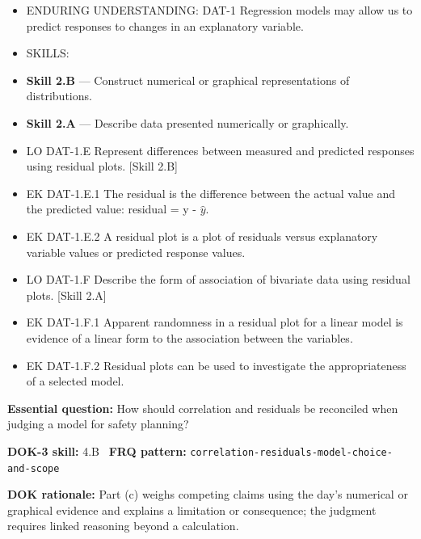 \documentclass[11pt]{article}
\begin{document}


{\small
\begin{itemize}[leftmargin=1.5em,itemsep=2pt,topsep=2pt]
  \item ENDURING UNDERSTANDING: DAT-1 Regression models may allow us to predict responses to changes in an explanatory variable.
  \item SKILLS:
  \item \textbf{Skill 2.B} --- Construct numerical or graphical representations of distributions.
  \item \textbf{Skill 2.A} --- Describe data presented numerically or graphically.
  \item LO DAT-1.E Represent differences between measured and predicted responses using residual plots. [Skill 2.B]
  \item EK DAT-1.E.1 The residual is the difference between the actual value and the predicted value: residual = y - $\widehat{y}$.
  \item EK DAT-1.E.2 A residual plot is a plot of residuals versus explanatory variable values or predicted response values.
  \item LO DAT-1.F Describe the form of association of bivariate data using residual plots. [Skill 2.A]
  \item EK DAT-1.F.1 Apparent randomness in a residual plot for a linear model is evidence of a linear form to the association between the variables.
  \item EK DAT-1.F.2 Residual plots can be used to investigate the appropriateness of a selected model.
\end{itemize}
}
\textbf{Essential question:} How should correlation and residuals be reconciled when judging a model for safety planning?\par
\textbf{DOK-3 skill:} 4.B \textperiodcentered\ \textbf{FRQ pattern:} {\small\texttt{correlation-\allowbreak{}residuals-\allowbreak{}model-\allowbreak{}choice-\allowbreak{}and-\allowbreak{}scope}}\par
\textbf{DOK rationale:} Part (c) weighs competing claims using the day's numerical or graphical evidence and explains a limitation or consequence; the judgment requires linked reasoning beyond a calculation.\par
\end{document}

